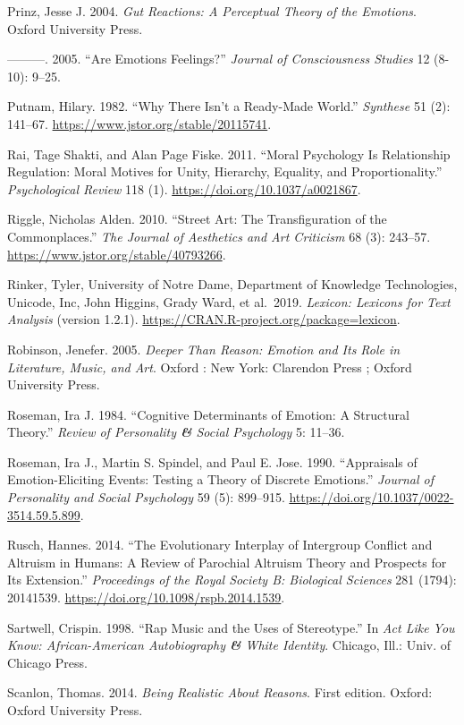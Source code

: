 \documentclass[
  letterpaper,
  DIV=11,
  numbers=noendperiod]{scrartcl}
\theoremstyle{remark}
\begin{document}
Prinz, Jesse J. 2004. \emph{Gut Reactions: A Perceptual Theory of the
Emotions}. Oxford University Press.

---------. 2005. ``Are Emotions Feelings?'' \emph{Journal of
Consciousness Studies} 12 (8-10): 9--25.

Putnam, Hilary. 1982. ``Why There Isn't a Ready-Made World.''
\emph{Synthese} 51 (2): 141--67.
\url{https://www.jstor.org/stable/20115741}.

Rai, Tage Shakti, and Alan Page Fiske. 2011. ``Moral Psychology Is
Relationship Regulation: Moral Motives for Unity, Hierarchy, Equality,
and Proportionality.'' \emph{Psychological Review} 118 (1).
\url{https://doi.org/10.1037/a0021867}.

Riggle, Nicholas Alden. 2010. ``Street Art: The Transfiguration of the
Commonplaces.'' \emph{The Journal of Aesthetics and Art Criticism} 68
(3): 243--57. \url{https://www.jstor.org/stable/40793266}.

Rinker, Tyler, University of Notre Dame, Department of Knowledge
Technologies, Unicode, Inc, John Higgins, Grady Ward, et al.~2019.
\emph{Lexicon: Lexicons for Text Analysis} (version 1.2.1).
\url{https://CRAN.R-project.org/package=lexicon}.

Robinson, Jenefer. 2005. \emph{Deeper Than Reason: Emotion and Its Role
in Literature, Music, and Art}. Oxford : New York: Clarendon Press ;
Oxford University Press.

Roseman, Ira J. 1984. ``Cognitive Determinants of Emotion: A Structural
Theory.'' \emph{Review of Personality \textbf{\&} Social Psychology} 5:
11--36.

Roseman, Ira J., Martin S. Spindel, and Paul E. Jose. 1990. ``Appraisals
of Emotion-Eliciting Events: Testing a Theory of Discrete Emotions.''
\emph{Journal of Personality and Social Psychology} 59 (5): 899--915.
\url{https://doi.org/10.1037/0022-3514.59.5.899}.

Rusch, Hannes. 2014. ``The Evolutionary Interplay of Intergroup Conflict
and Altruism in Humans: A Review of Parochial Altruism Theory and
Prospects for Its Extension.'' \emph{Proceedings of the Royal Society B:
Biological Sciences} 281 (1794): 20141539.
\url{https://doi.org/10.1098/rspb.2014.1539}.

Sartwell, Crispin. 1998. ``Rap Music and the Uses of Stereotype.'' In
\emph{Act Like You Know: African-American Autobiography \textbf{\&}
White Identity}. Chicago, Ill.: Univ. of Chicago Press.

Scanlon, Thomas. 2014. \emph{Being Realistic About Reasons}. First
edition. Oxford: Oxford University Press.
\end{document}
